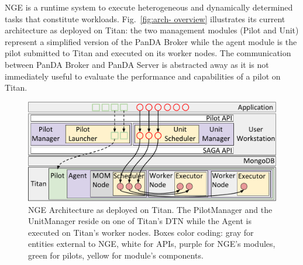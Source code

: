 
NGE is a runtime system to execute heterogeneous and dynamically determined
tasks that constitute workloads. Fig.~\ref{fig:arch- overview} illustrates its
current architecture as deployed on Titan: the two management modules (Pilot
and Unit) represent a simplified version of the PanDA Broker while the agent
module is the pilot submitted to Titan and executed on its worker nodes. The
communication between PanDA Broker and PanDA Server is abstracted away as it
is not immediately useful to evaluate the performance and capabilities of a
pilot on Titan.


\begin{figure}
  \centering
   \includegraphics[width=\columnwidth]{figures/rp_architecture_compact_atlaswms_paper.pdf}
  \caption{NGE Architecture as deployed on Titan. The PilotManager and the
  UnitManager reside on one of Titan's DTN while the Agent is executed on
  Titan's worker nodes. Boxes color coding: gray for entities external to NGE,
  white for APIs, purple for NGE's modules, green for pilots, yellow for
  module's components.}
\label{fig:arch-overview}
\end{figure}

